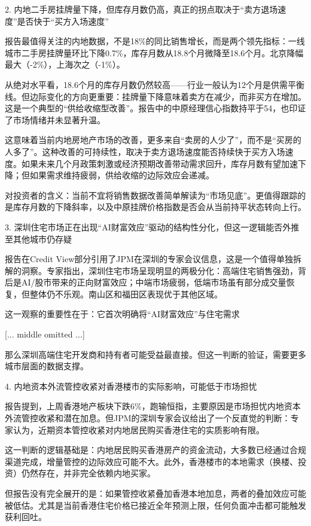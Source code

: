 \documentclass[11pt]{ctexart}
\begin{document}
2. 内地二手房挂牌量下降，但库存月数仍高，真正的拐点取决于“卖方退场速度”是否快于“买方入场速度”

报告最值得关注的内地数据，不是18\%的同比销售增长，而是两个领先指标：一线城市二手房挂牌量环比下降0.7\%，库存月数从18.8个月微降至18.6个月。北京降幅最大（-2\%），上海次之（-1\%）。

从绝对水平看，18.6个月的库存月数仍然较高——行业一般认为12个月是供需平衡线。但边际变化的方向更重要：挂牌量下降意味着卖方在减少，而非买方在增加。这是一个典型的“供给收缩型改善”。报告中的中原经理信心指数持平于54，也印证了市场情绪并未显著升温。

这意味着当前内地房地产市场的改善，更多来自“卖房的人少了”，而不是“买房的人多了”。这种改善的可持续性，取决于卖方退场速度能否持续快于买方入场速度。如果未来几个月政策刺激或经济预期改善带动需求回升，库存月数有望加速下降；但如果需求维持疲弱，供给收缩的边际效应会递减。

对投资者的含义：当前不宜将销售数据改善简单解读为“市场见底”。更值得跟踪的是库存月数的下降斜率，以及中原挂牌价格指数是否会从当前持平状态转向上行。

3. 深圳住宅市场正在出现“AI财富效应”驱动的结构性分化，但这一逻辑能否外推至其他城市仍存疑

报告在Credit View部分引用了JPM在深圳的专家会议信息，这是一个值得单独拆解的洞察。专家指出，深圳住宅市场呈现明显的两极分化：高端住宅销售强劲，背后是AI/股市带来的正向财富效应；中端市场疲弱，低端市场虽有部分成交量恢复，但整体仍不乐观。南山区和福田区表现优于其他区域。

这一观察的重要性在于：它首次明确将“AI财富效应”与住宅需求

[... middle omitted ...]

那么深圳高端住宅开发商和持有者可能受益最直接。但这一判断的验证，需要更多城市层面的数据支撑。

4. 内地资本外流管控收紧对香港楼市的实际影响，可能低于市场担忧

报告提到，上周香港地产板块下跌6\%，跑输恒指，主要原因是市场担忧内地资本外流管控收紧和潜在加息。但JPM的深圳专家会议给出了一个反直觉的判断：专家认为，近期资本管控收紧对内地居民购买香港住宅的实质影响有限。

这一判断的逻辑基础是：内地居民购买香港房产的资金流动，大多数已经通过合规渠道完成，增量管控的边际效应可能不大。此外，香港楼市的本地需求（换楼、投资）仍然存在，并非完全依赖内地买家。

但报告没有完全展开的是：如果管控收紧叠加香港本地加息，两者的叠加效应可能被低估。尤其是当前香港住宅价格已接近全年预测上限，任何负面冲击都可能触发获利回吐。
\end{document}
